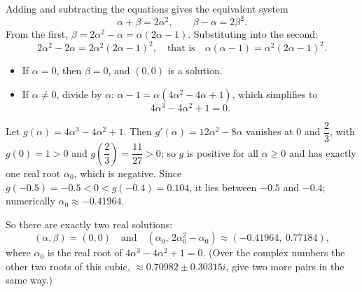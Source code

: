 Adding and subtracting the equations gives the equivalent system
\[
\alpha+\beta=2\alpha^2,\qquad \beta-\alpha=2\beta^2 .
\]
From the first, $\beta=2\alpha^2-\alpha=\alpha(2\alpha-1)$. Substituting into the second:
\[
2\alpha^2-2\alpha=2\alpha^2(2\alpha-1)^2,\quad\text{that is}\quad \alpha(\alpha-1)=\alpha^2(2\alpha-1)^2 .
\]
\begin{itemize}
\item If $\alpha=0$, then $\beta=0$, and $(0,0)$ is a solution.
\item If $\alpha\ne0$, divide by $\alpha$: $\alpha-1=\alpha(4\alpha^2-4\alpha+1)$, which simplifies to
\[
4\alpha^3-4\alpha^2+1=0 .
\]
\end{itemize}
Let $g(\alpha)=4\alpha^3-4\alpha^2+1$. Then $g'(\alpha)=12\alpha^2-8\alpha$ vanishes at $0$ and $\dfrac{2}{3}$, with $g(0)=1>0$ and $g\left(\dfrac{2}{3}\right)=\dfrac{11}{27}>0$; so $g$ is positive for all $\alpha\ge0$ and has exactly one real root $\alpha_0$, which is negative. Since $g(-0.5)=-0.5<0<g(-0.4)=0.104$, it lies between $-0.5$ and $-0.4$; numerically $\alpha_0\approx-0.41964$.

So there are exactly two real solutions:
\[
\boxed{(\alpha,\beta)=(0,0)\quad\text{and}\quad(\alpha_0,\,2\alpha_0^2-\alpha_0)\approx(-0.41964,\ 0.77184),}
\]
where $\alpha_0$ is the real root of $4\alpha^3-4\alpha^2+1=0$. (Over the complex numbers the other two roots of this cubic, $\approx0.70982\pm0.30315i$, give two more pairs in the same way.)
